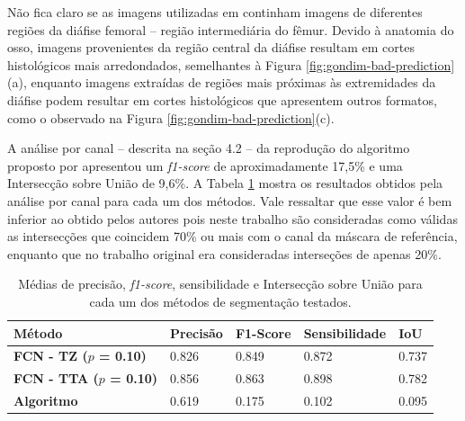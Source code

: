 Não fica claro se as imagens utilizadas em \cite{gondim2021automatic} continham imagens de diferentes regiões da diáfise femoral -- região intermediária do fêmur. Devido à anatomia do osso, imagens provenientes da região central da diáfise resultam em cortes histológicos mais arredondados, semelhantes à Figura \ref{fig:gondim-bad-prediction}(a), enquanto imagens extraídas de regiões mais próximas às extremidades da diáfise podem resultar em cortes histológicos que apresentem outros formatos, como o observado na Figura \ref{fig:gondim-bad-prediction}(c). 

A análise por canal -- descrita na seção 4.2 -- da reprodução do algoritmo proposto por \cite{gondim2021automatic} apresentou um \textit{f1-score} de aproximadamente 17,5\% e uma Intersecção sobre União de 9,6\%. A Tabela \ref{tab:metricas-comparacao-por-canal} mostra os resultados obtidos pela análise por canal para cada um dos métodos. Vale ressaltar que esse valor é bem inferior ao obtido pelos autores pois neste trabalho são consideradas como válidas as intersecções que coincidem 70\% ou mais com o canal da máscara de referência, enquanto que no trabalho original era consideradas interseções de apenas 20\%.


\begin{table}[h]
\center
\begin{tiny}
\begin{tabular}{|l|l|l|l|l|}
\hline
\rowcolor[HTML]{C0C0C0} 
\textbf{Método} & \textbf{Precisão} & \textbf{F1-Score} & \textbf{Sensibilidade}   & \textbf{IoU}     \\ 
\hline
\cellcolor[HTML]{EFEFEF}\textbf{FCN - TZ ($p$ = 0.10)} & 0.826 & 0.849 & 0.872 & 0.737 \\
\hline
\cellcolor[HTML]{EFEFEF}\textbf{FCN - TTA ($p$ = 0.10)} & 0.856 & 0.863 & 0.898 & 0.782 \\
\hline
\cellcolor[HTML]{EFEFEF}\textbf{Algoritmo \cite{gondim2021automatic}} & 0.619 & 0.175 & 0.102 & 0.095 \\
\hline
\end{tabular}
\end{tiny}
\caption{Médias de precisão, \textit{f1-score}, sensibilidade e Intersecção sobre União para cada um dos métodos de segmentação testados.}
    \label{tab:metricas-comparacao-por-canal}
\end{table}